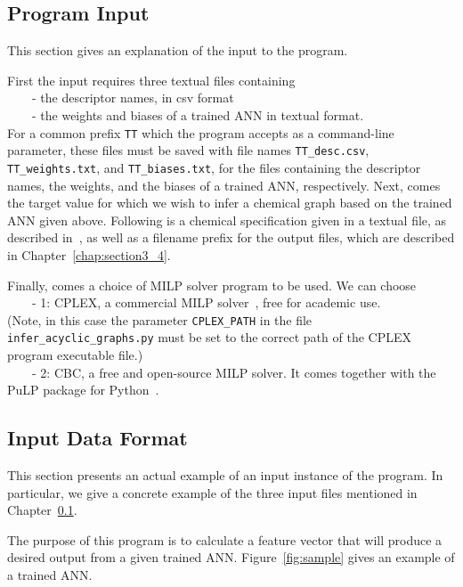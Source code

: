 \documentclass[11pt,titlepage,dvipdfmx,twoside]{book}
\begin{document}
\subsection{Program Input}
\label{chap:section3_1}

This section gives an explanation of the input to the program.

First
the input requires three textual files containing \\
~~~~- the descriptor names, in csv format \\
~~~~- the weights and biases of a trained ANN in textual format.\\
For a common prefix {\tt TT} which the program accepts as a command-line parameter,
these files must be saved with file names {\tt TT\_desc.csv}, 
{\tt TT\_weights.txt}, and {\tt TT\_biases.txt}, for the files containing
the descriptor names, the weights, and the biases of a trained ANN, respectively.
%
Next, comes the target value for which we wish to infer 
a chemical graph based on the trained ANN given above.
Following is a chemical specification given in a textual file,
as described in~\cite{AN20}, 
as well as a filename prefix for the output files,  which are described in Chapter~\ref{chap:section3_4}.

Finally, comes a choice of MILP solver program to be used.
We can choose \\
~~~~- 1: CPLEX, a commercial MILP solver~\cite{cplex}, free for academic use. \\
(Note, in this case the parameter {\tt CPLEX\_PATH} in the file {\tt infer\_acyclic\_graphs.py}
must be set to the correct path of the CPLEX program executable file.) \\
~~~~- 2: CBC, a free and open-source MILP solver. 
It comes together with the PuLP package for Python~\cite{PuLP1}.




\subsection{Input Data Format}
\label{chap:section3_2}

This section presents an actual example of an input instance of the program.
In particular, we give a concrete example of the three input files
mentioned in Chapter~\ref{chap:section3_1}.

The purpose of this program is to calculate a feature vector that will produce a desired output from a 
given trained ANN.
Figure~\ref{fig:sample} gives an example of a trained ANN.
\end{document}
